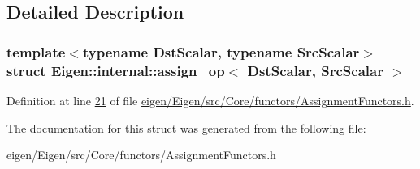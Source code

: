 \subsection{Detailed Description}
\subsubsection*{template$<$typename Dst\+Scalar, typename Src\+Scalar$>$\newline
struct Eigen\+::internal\+::assign\+\_\+op$<$ Dst\+Scalar, Src\+Scalar $>$}



Definition at line \hyperlink{eigen_2_eigen_2src_2_core_2functors_2_assignment_functors_8h_source_l00021}{21} of file \hyperlink{eigen_2_eigen_2src_2_core_2functors_2_assignment_functors_8h_source}{eigen/\+Eigen/src/\+Core/functors/\+Assignment\+Functors.\+h}.



The documentation for this struct was generated from the following file\+:\begin{DoxyCompactItemize}
\item 
eigen/\+Eigen/src/\+Core/functors/\+Assignment\+Functors.\+h\end{DoxyCompactItemize}
